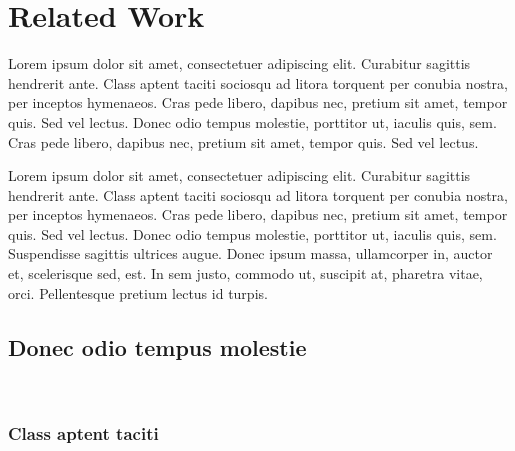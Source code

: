\lipsum[1-2]

% 

\chapter{Related Work}

\begin{chapterabstract}
	Lorem ipsum dolor sit amet, consectetuer adipiscing elit. Curabitur sagittis hendrerit ante. Class aptent taciti sociosqu ad litora torquent per conubia nostra, per inceptos hymenaeos. Cras pede libero, dapibus nec, pretium sit amet, tempor quis. Sed vel lectus. Donec odio tempus molestie, porttitor ut, iaculis quis, sem. Cras pede libero, dapibus nec, pretium sit amet, tempor quis. Sed vel lectus. 
\end{chapterabstract}

Lorem ipsum dolor sit amet, consectetuer adipiscing elit. Curabitur sagittis hendrerit ante. Class aptent taciti sociosqu ad litora torquent per conubia nostra, per inceptos hymenaeos. Cras pede libero, dapibus nec, pretium sit amet, tempor quis. Sed vel lectus. Donec odio tempus molestie, porttitor ut, iaculis quis, sem. Suspendisse sagittis ultrices augue. Donec ipsum massa, ullamcorper in, auctor et, scelerisque sed, est. In sem justo, commodo ut, suscipit at, pharetra vitae, orci. Pellentesque pretium lectus id turpis.~\cite{Kopka2004}

\section{Donec odio tempus molestie}

\lipsum[2]~\cite{def:1, def:2}

\subsection{Class aptent taciti}

\lipsum[2-3]

